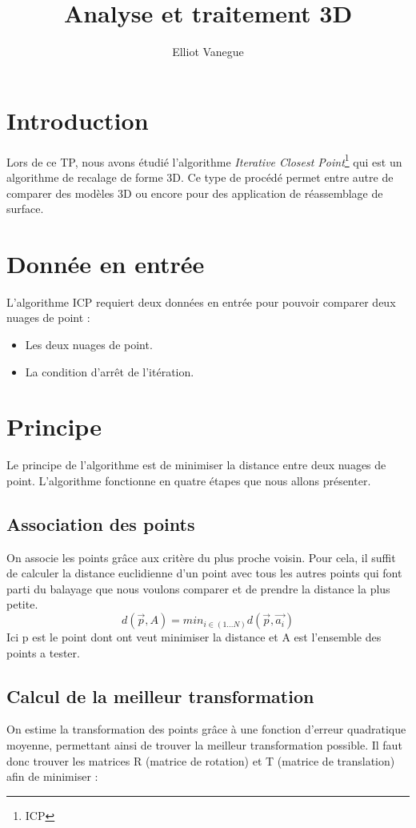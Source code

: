 \documentclass[a4paper,10pt]{article}
\title{Analyse et traitement 3D}
\author{Elliot Vanegue}
\begin{document}
\maketitle

\section{Introduction}
Lors de ce TP, nous avons étudié l'algorithme \textit{Iterative Closest Point}\footnote{ICP} qui est un algorithme de recalage de forme 3D. Ce type de procédé permet entre autre de comparer des modèles 3D ou encore pour des application de réassemblage de surface.

\section{Donnée en entrée}
L'algorithme ICP requiert deux données en entrée pour pouvoir comparer deux nuages de point :
\begin{itemize}
\item Les deux nuages de point.
\item La condition d'arrêt de l'itération.
\end{itemize}

\section{Principe}
Le principe de l'algorithme est de minimiser la distance entre deux nuages de point. L'algorithme fonctionne en quatre étapes que nous allons présenter.

\subsection{Association des points}
On associe les points grâce aux critère du plus proche voisin. Pour cela, il suffit de calculer la distance euclidienne d'un point avec tous les autres points qui font parti du balayage que nous voulons comparer et de prendre la distance la plus petite.
\begin{equation}
d(\vec{p}, A) = min_{i\in{(1...N)}} d(\vec{p},\vec{a_i})
\end{equation}
Ici p est le point dont ont veut minimiser la distance et A est l'ensemble des points a tester.

\subsection{Calcul de la meilleur transformation}
On estime la transformation des points grâce à une fonction d'erreur quadratique moyenne, permettant ainsi de trouver la meilleur transformation possible. Il faut donc trouver les matrices R (matrice de rotation) et T (matrice de translation) afin de minimiser :
\end{document}
